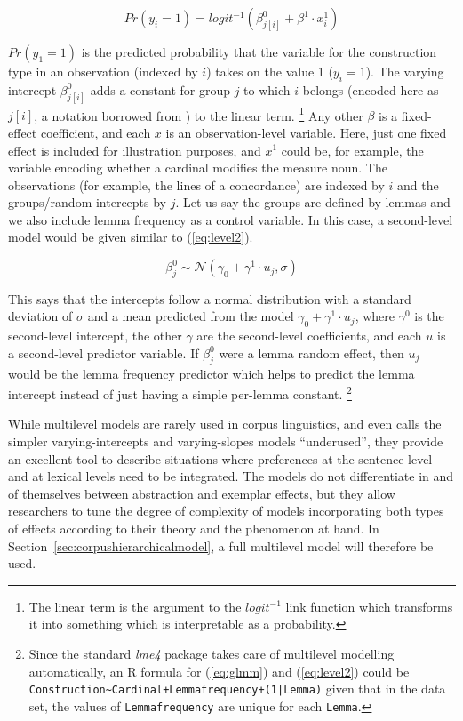 \begin{equation}
  Pr(y_i=1)=logit^{-1}(\beta^0_{j[i]}+\beta^1\cdot x^1_i)
  \label{eq:glmm}
\end{equation}

$Pr(y_1=1)$ is the predicted probability that the variable for the construction type in an observation (indexed by $i$) takes on the value 1 ($y_i=1$).
The varying intercept $\beta^0_{j[i]}$ adds a constant for group $j$ to which $i$ belongs (encoded here as $j[i]$, a notation borrowed from \citealp{GelmanHill2006}) to the linear term.%
\footnote{The linear term is the argument to the $logit^{-1}$ link function which transforms it into something which is interpretable as a probability.}
Any other $\beta$ is a fixed-effect coefficient, and each $x$ is an observation-level variable.
Here, just one fixed effect is included for illustration purposes, and $x^1$ could be, for example, the variable encoding whether a cardinal modifies the measure noun.
The observations (for example, the lines of a concordance) are indexed by $i$ and the groups\slash random intercepts by $j$.
Let us say the groups are defined by lemmas and we also include lemma frequency as a control variable.
In this case, a second-level model would be given similar to (\ref{eq:level2}).

\begin{equation}
  \beta^0_j\sim\mathcal{N}(\gamma_0+\gamma^1\cdot u_j, \sigma)
  \label{eq:level2}
\end{equation}

This says that the intercepts follow a normal distribution with a standard deviation of $\sigma$ and a mean predicted from the model $\gamma_0+\gamma^1\cdot u_j$, where $\gamma^0$ is the second-level intercept, the other $\gamma$ are the second-level coefficients, and each $u$ is a second-level predictor variable.
If $\beta^0_{j}$ were a lemma random effect, then $u_j$ would be the lemma frequency predictor which helps to predict the lemma intercept instead of just having a simple per-lemma constant.%
\footnote{Since the standard \textit{lme4} package takes care of multilevel modelling automatically, an R formula for (\ref{eq:glmm}) and (\ref{eq:level2}) could be \texttt{Construction\textasciitilde Cardinal+Lemmafrequency+(1|Lemma)} given that in the data set, the values of \texttt{Lemmafrequency} are unique for each \texttt{Lemma}.}

While multilevel models are rarely used in corpus linguistics, and \citet{Gries2015} even calls the simpler varying-intercepts and varying-slopes models ``underused'', they provide an excellent tool to describe situations where preferences at the sentence level and at lexical levels need to be integrated.
The models do not differentiate in and of themselves between abstraction and exemplar effects, but they allow researchers to tune the degree of complexity of models incorporating both types of effects according to their theory and the phenomenon at hand.
In Section~\ref{sec:corpushierarchicalmodel}, a full multilevel model will therefore be used.
